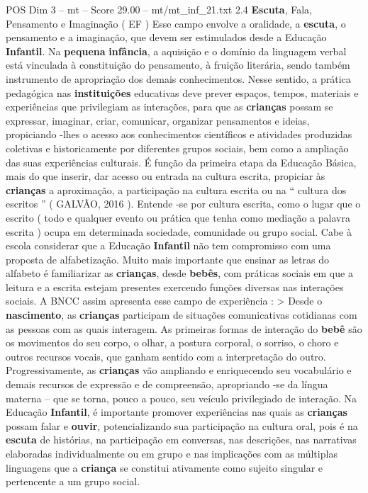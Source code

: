 \begin{textsample}{POS Dim 3 – mt – Score 29.00 – mt/mt\_inf\_21.txt}  \label{ex:f3_pos_074}
2.4 \textbf{Escuta}, Fala, Pensamento e Imaginação ( EF ) Esse campo envolve a oralidade, a \textbf{escuta}, o pensamento e a imaginação, que devem ser estimulados desde a Educação \textbf{Infantil}.
Na \textbf{pequena} \textbf{infância}, a aquisição e o domínio da linguagem verbal está vinculada à constituição do pensamento, à fruição literária, sendo também instrumento de apropriação dos demais conhecimentos.
Nesse sentido, a prática pedagógica nas \textbf{instituições} educativas deve prever espaços, tempos, materiais e experiências que privilegiam as interações, para que as \textbf{crianças} possam se expressar, imaginar, criar, comunicar, organizar pensamentos e ideias, propiciando -lhes o acesso aos conhecimentos científicos e atividades produzidas coletivas e historicamente por diferentes grupos sociais, bem como a ampliação das suas experiências culturais.
É função da primeira etapa da Educação Básica, mais do que inserir, dar acesso ou entrada na cultura escrita, propiciar às \textbf{crianças} a aproximação, a participação na cultura escrita ou na “ cultura dos escritos ” ( GALVÃO, 2016 ).
Entende -se por cultura escrita, como o lugar que o escrito ( todo e qualquer evento ou prática que tenha como mediação a palavra escrita ) ocupa em determinada sociedade, comunidade ou grupo social.
Cabe à escola considerar que a Educação \textbf{Infantil} não tem compromisso com uma proposta de alfabetização.
Muito mais importante que ensinar as letras do alfabeto é familiarizar as \textbf{crianças}, desde \textbf{bebês}, com práticas sociais em que a leitura e a escrita estejam presentes exercendo funções diversas nas interações sociais.
A BNCC assim apresenta esse campo de experiência : > Desde o \textbf{nascimento}, as \textbf{crianças} participam de situações comunicativas cotidianas com as pessoas com as quais interagem.
As primeiras formas de interação do \textbf{bebê} são os movimentos do seu corpo, o olhar, a postura corporal, o sorriso, o choro e outros recursos vocais, que ganham sentido com a interpretação do outro.
Progressivamente, as \textbf{crianças} vão ampliando e enriquecendo seu vocabulário e demais recursos de expressão e de compreensão, apropriando -se da língua materna – que se torna, pouco a pouco, seu veículo privilegiado de interação.
Na Educação \textbf{Infantil}, é importante promover experiências nas quais as \textbf{crianças} possam falar e \textbf{ouvir}, potencializando sua participação na cultura oral, pois é na \textbf{escuta} de histórias, na participação em conversas, nas descrições, nas narrativas elaboradas individualmente ou em grupo e nas implicações com as múltiplas linguagens que a \textbf{criança} se constitui ativamente como sujeito singular e pertencente a um grupo social.

\end{textsample}
